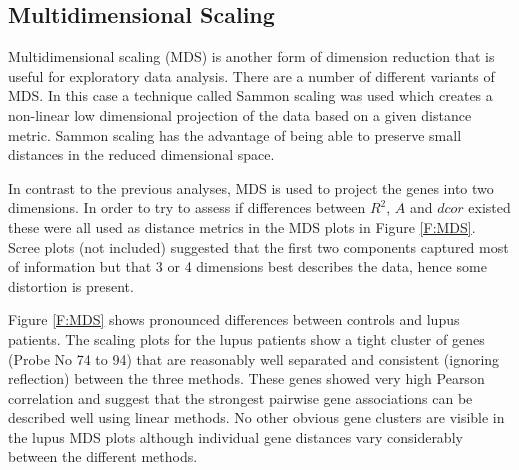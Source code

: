 \documentclass[a4paper, 12pt]{report}
\begin{document}

\subsection*{Multidimensional Scaling}
Multidimensional scaling (MDS) is another form of dimension reduction that is useful for exploratory data analysis. There are a number of different variants of \gls{MDS}. In this case a technique called Sammon scaling was used which creates a non-linear low dimensional projection of the data based on a given distance metric. Sammon scaling has the advantage of being able to preserve small distances in the reduced dimensional space. 

In contrast to the previous analyses, MDS is used to project the genes into two dimensions. In order to try to assess if differences  between $R^2$, $A$ and $dcor$ existed these were all used as distance metrics in the MDS plots in Figure \ref{F:MDS}. Scree plots (not included) suggested that the first two components captured most of information but that 3 or 4 dimensions best describes the data, hence some distortion is present. 

 Figure \ref{F:MDS} shows pronounced differences between controls and lupus patients. The scaling plots for the lupus patients show a tight cluster of genes (Probe No 74 to 94) that are reasonably well separated and consistent (ignoring reflection) between the three methods. These genes showed very high Pearson correlation and suggest that the strongest pairwise gene associations can be described well using linear methods. No other obvious gene clusters are visible in the lupus MDS plots although individual gene distances vary considerably between the different methods. 

\end{document}
